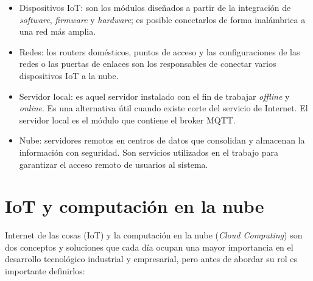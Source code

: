 \vspace{1.0cm}

\begin{itemize}
\item Dispositivos IoT: son los módulos diseñados a partir de la integración de \emph{software}, \emph{firmware} y \emph{hardware}; es posible conectarlos de forma inalámbrica a una red más amplia.
\item Redes: los routers domésticos, puntos de acceso y las configuraciones de las redes o las puertas de enlaces son los responsables de conectar varios dispositivos IoT a la nube.
\item Servidor local: es aquel servidor instalado con el fin de trabajar \emph{offline} y \emph{online}. Es una alternativa útil cuando existe corte del servicio de Internet. El servidor local es el módulo que contiene el broker MQTT. 
\item Nube: servidores remotos en centros de datos que consolidan y almacenan la información con seguridad. Son servicios utilizados en el trabajo para garantizar el acceso remoto de usuarios al sistema.
\end{itemize}



\section{IoT y computación en la nube}

Internet de las cosas (IoT) y la computación en la nube (\emph{Cloud Computing}) son dos conceptos y soluciones que cada día ocupan una mayor importancia en el desarrollo tecnológico industrial y empresarial, pero antes de abordar su rol es importante definirlos:


